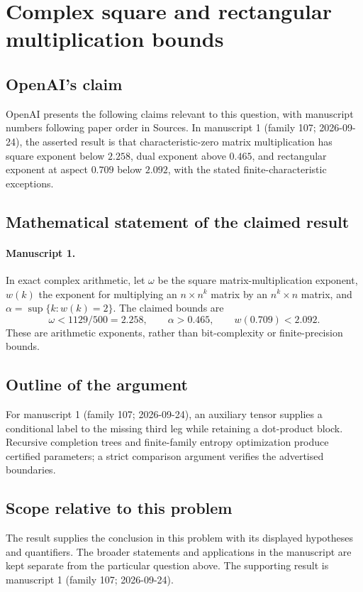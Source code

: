 \documentclass[11pt]{article}
\begin{document}
\section*{Complex square and rectangular multiplication bounds}

\subsection{OpenAI's claim}
OpenAI presents the following claims relevant to this question, with manuscript numbers following paper order in Sources. In manuscript 1 (family 107; 2026-09-24), the asserted result is that characteristic-zero matrix multiplication has square exponent below $2.258$, dual exponent above $0.465$, and rectangular exponent at aspect $0.709$ below $2.092$, with the stated finite-characteristic exceptions.

\subsection{Mathematical statement of the claimed result}
\paragraph{Manuscript 1.}
In exact complex arithmetic, let $\omega$ be the square matrix-multiplication exponent, $w(k)$ the exponent for multiplying an $n\times n^k$ matrix by an $n^k\times n$ matrix, and $\alpha=\sup\{k:w(k)=2\}$. The claimed bounds are
\[
 \omega<1129/500=2.258,\qquad\alpha>0.465,\qquad w(0.709)<2.092.
\]
These are arithmetic exponents, rather than bit-complexity or finite-precision bounds.

\subsection{Outline of the argument}
For manuscript 1 (family 107; 2026-09-24), an auxiliary tensor supplies a conditional label to the missing third leg while retaining a dot-product block. Recursive completion trees and finite-family entropy optimization produce certified parameters; a strict comparison argument verifies the advertised boundaries.

\subsection{Scope relative to this problem}
The result supplies the conclusion in this problem with its displayed hypotheses and quantifiers. The broader statements and applications in the manuscript are kept separate from the particular question above. The supporting result is manuscript 1 (family 107; 2026-09-24).
\end{document}
